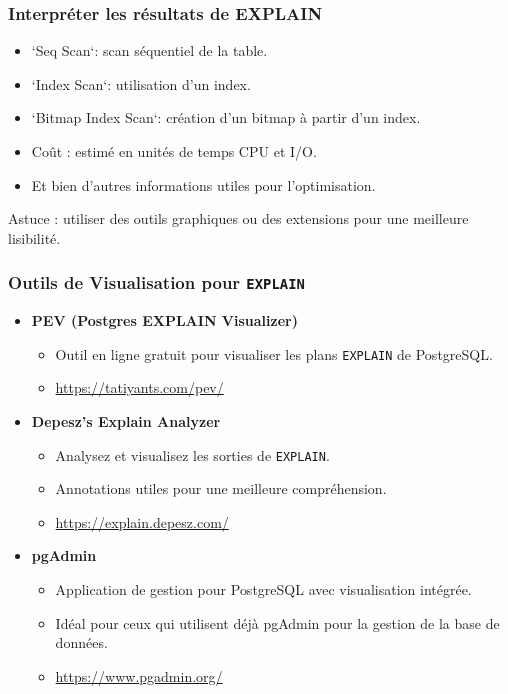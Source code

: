 \begin{frame}
  \frametitle{Interpréter les résultats de EXPLAIN}

  \begin{itemize}
    \item `Seq Scan`: scan séquentiel de la table.
    \item `Index Scan`: utilisation d'un index.
    \item `Bitmap Index Scan`: création d'un bitmap à partir d'un index.
    \item Coût : estimé en unités de temps CPU et I/O.
    \item Et bien d'autres informations utiles pour l'optimisation.
  \end{itemize}

  Astuce : utiliser des outils graphiques ou des extensions pour une meilleure lisibilité.
\end{frame}

\begin{frame}
  \frametitle{Outils de Visualisation pour \texttt{EXPLAIN}}

  \begin{itemize}
    \item \textbf{PEV (Postgres EXPLAIN Visualizer)}
    \begin{itemize}
      \item Outil en ligne gratuit pour visualiser les plans \texttt{EXPLAIN} de PostgreSQL.
      \item \url{https://tatiyants.com/pev/}
    \end{itemize}

    \vspace{0.5em}

    \item \textbf{Depesz's Explain Analyzer}
    \begin{itemize}
      \item Analysez et visualisez les sorties de \texttt{EXPLAIN}.
      \item Annotations utiles pour une meilleure compréhension.
      \item \url{https://explain.depesz.com/}
    \end{itemize}

    \vspace{0.5em}

    \item \textbf{pgAdmin}
    \begin{itemize}
      \item Application de gestion pour PostgreSQL avec visualisation intégrée.
      \item Idéal pour ceux qui utilisent déjà pgAdmin pour la gestion de la base de données.
      \item \url{https://www.pgadmin.org/}
    \end{itemize}
  \end{itemize}
\end{frame}
